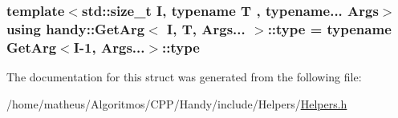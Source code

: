 \subsubsection[{\texorpdfstring{type}{type}}]{\setlength{\rightskip}{0pt plus 5cm}template$<$std\+::size\+\_\+t I, typename T , typename... Args$>$ using {\bf handy\+::\+Get\+Arg}$<$ I, T, Args... $>$\+::{\bf type} =  typename {\bf Get\+Arg}$<$I-\/1, Args...$>$\+::{\bf type}}\hypertarget{structhandy_1_1GetArg_3_01I_00_01T_00_01Args_8_8_8_01_4_a58d88c2429703df5203c70ab307813ab}{}\label{structhandy_1_1GetArg_3_01I_00_01T_00_01Args_8_8_8_01_4_a58d88c2429703df5203c70ab307813ab}


The documentation for this struct was generated from the following file\+:\begin{DoxyCompactItemize}
\item 
/home/matheus/\+Algoritmos/\+C\+P\+P/\+Handy/include/\+Helpers/\hyperlink{Helpers_2Helpers_8h}{Helpers.\+h}\end{DoxyCompactItemize}

